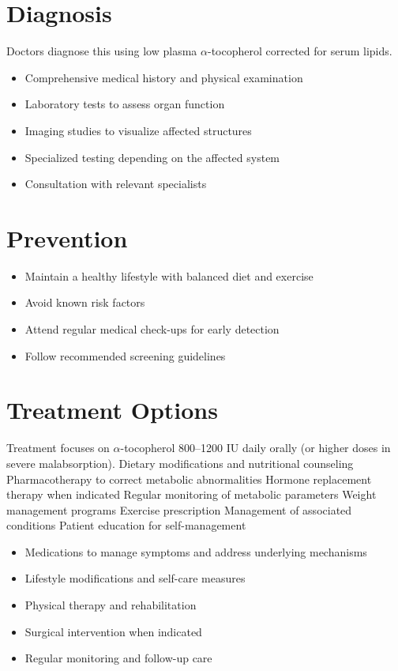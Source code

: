 \section{Diagnosis}
Doctors diagnose this using low plasma $\alpha$-tocopherol corrected for serum lipids.

\begin{itemize}[noitemsep]
  \item Comprehensive medical history and physical examination
  \item Laboratory tests to assess organ function
  \item Imaging studies to visualize affected structures
  \item Specialized testing depending on the affected system
  \item Consultation with relevant specialists
\end{itemize}
\section{Prevention}
\begin{itemize}[noitemsep]
  \item Maintain a healthy lifestyle with balanced diet and exercise
  \item Avoid known risk factors
  \item Attend regular medical check-ups for early detection
  \item Follow recommended screening guidelines
\end{itemize}
\section{Treatment Options}
Treatment focuses on $\alpha$-tocopherol 800--1200 IU daily orally (or higher doses in severe malabsorption). Dietary modifications and nutritional counseling Pharmacotherapy to correct metabolic abnormalities Hormone replacement therapy when indicated Regular monitoring of metabolic parameters Weight management programs Exercise prescription Management of associated conditions Patient education for self-management

\begin{itemize}[noitemsep]
  \item Medications to manage symptoms and address underlying mechanisms
  \item Lifestyle modifications and self-care measures
  \item Physical therapy and rehabilitation
  \item Surgical intervention when indicated
  \item Regular monitoring and follow-up care
\end{itemize}
